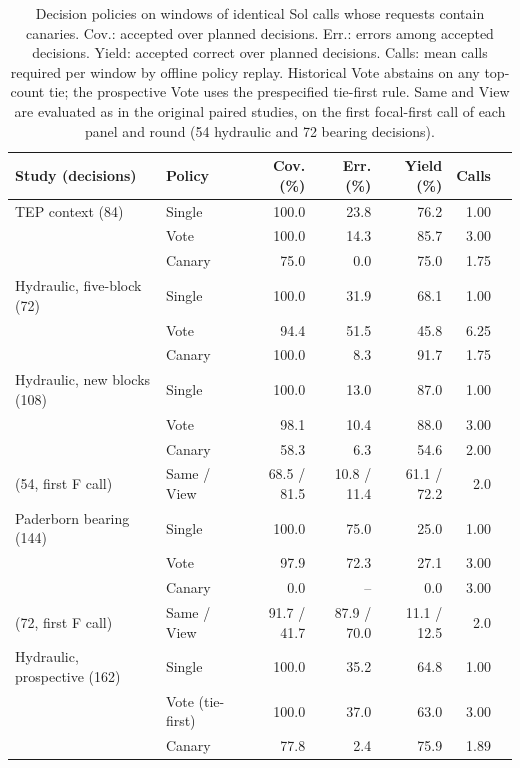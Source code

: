 \documentclass[11pt,a4paper]{article}
\begin{document}
\begin{table}[htbp]\centering\small
\caption{Decision policies on windows of identical Sol calls whose requests contain canaries. Cov.: accepted over planned decisions. Err.: errors among accepted decisions. Yield: accepted correct over planned decisions. Calls: mean calls required per window by offline policy replay. Historical Vote abstains on any top-count tie; the prospective Vote uses the prespecified tie-first rule. Same and View are evaluated as in the original paired studies, on the first focal-first call of each panel and round (54 hydraulic and 72 bearing decisions).}
\label{tab:policies}
\setlength{\tabcolsep}{4pt}
\begin{tabular}{@{}llrrrrr@{}}\toprule
Study (decisions) & Policy & Cov. (\%) & Err. (\%) & Yield (\%) & Calls \\\midrule
TEP context (84) & Single & 100.0 & 23.8 & 76.2 & 1.00 \\
 & Vote & 100.0 & 14.3 & 85.7 & 3.00 \\
 & Canary & 75.0 & 0.0 & 75.0 & 1.75 \\\addlinespace
Hydraulic, five-block (72) & Single & 100.0 & 31.9 & 68.1 & 1.00 \\
 & Vote & 94.4 & 51.5 & 45.8 & 6.25 \\
 & Canary & 100.0 & 8.3 & 91.7 & 1.75 \\\addlinespace
Hydraulic, new blocks (108) & Single & 100.0 & 13.0 & 87.0 & 1.00 \\
 & Vote & 98.1 & 10.4 & 88.0 & 3.00 \\
 & Canary & 58.3 & 6.3 & 54.6 & 2.00 \\
\quad (54, first F call) & Same / View & 68.5 / 81.5 & 10.8 / 11.4 & 61.1 / 72.2 & 2.0 \\\addlinespace
Paderborn bearing (144) & Single & 100.0 & 75.0 & 25.0 & 1.00 \\
 & Vote & 97.9 & 72.3 & 27.1 & 3.00 \\
 & Canary & 0.0 & -- & 0.0 & 3.00 \\
\quad (72, first F call) & Same / View & 91.7 / 41.7 & 87.9 / 70.0 & 11.1 / 12.5 & 2.0 \\
\addlinespace
Hydraulic, prospective (162) & Single & 100.0 & 35.2 & 64.8 & 1.00 \\
 & Vote (tie-first) & 100.0 & 37.0 & 63.0 & 3.00 \\
 & Canary & 77.8 & 2.4 & 75.9 & 1.89 \\
\bottomrule\end{tabular}
\end{table}
\end{document}
